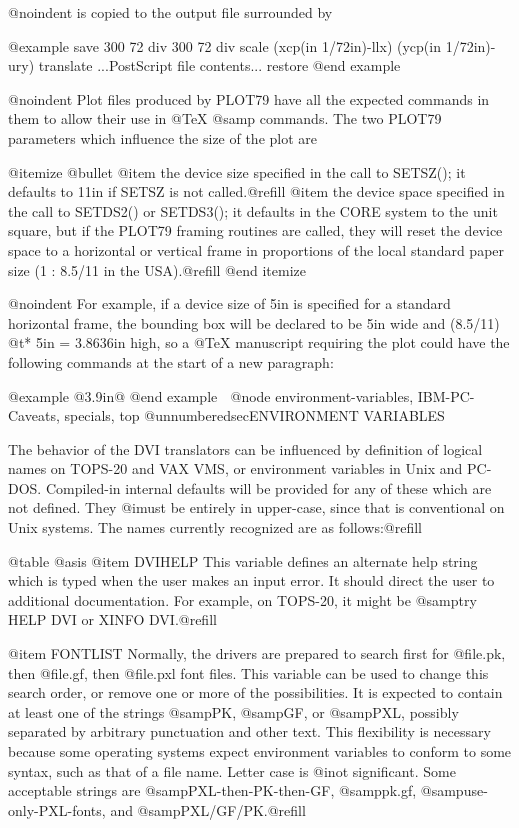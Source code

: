 {@noindent
is copied to the output file surrounded by

@example
save
300 72 div 300 72 div scale %
(xcp(in 1/72in)-llx) (ycp(in 1/72in)-ury) translate
...PostScript file contents...
restore
@end example

@noindent
Plot files produced by PLOT79 have all the expected commands in
them to allow their use in @TeX{} @samp{} commands.
The two PLOT79 parameters which influence the size of the plot
are

@itemize @bullet
@item
the device size specified in the call to SETSZ(); it defaults
to 11in if SETSZ is not called.@refill
@item
the device space specified in the call to SETDS2() or
SETDS3(); it defaults in the CORE system to the unit square,
but if the PLOT79 framing routines are called, they will
reset the device space to a horizontal or vertical frame in
proportions of the local standard paper size (1 : 8.5/11 in
the USA).@refill
@end itemize

@noindent
For example, if a device size of 5in is specified for a standard
horizontal frame, the bounding box will be declared to be 5in
wide and (8.5/11) @t{*} 5in = 3.8636in high, so a @TeX{} manuscript
requiring the plot could have the following commands at the start
of a new paragraph:

@example
\vspace*@{3.9in@}
@end example

@node environment-variables, IBM-PC-Caveats, specials, top
@unnumberedsec{ENVIRONMENT VARIABLES}

The behavior of the DVI translators can be influenced by
definition of logical names on TOPS-20 and VAX VMS, or
environment variables in Unix and PC-DOS.  Compiled-in internal
defaults will be provided for any of these which are not defined.
They @i{must} be entirely in upper-case, since that is
conventional on Unix systems.  The names currently recognized are
as follows:@refill

@table @asis
@item DVIHELP
This variable defines an alternate help string which is typed
when the user makes an input error.  It should direct the
user to additional documentation.  For example, on TOPS-20,
it might be @samp{try HELP DVI or XINFO DVI}.@refill

@item FONTLIST
Normally, the drivers are prepared to search first for
@file{.pk}, then @file{.gf}, then @file{.pxl} font files.
This variable can be used to change this search order, or
remove one or more of the possibilities.  It is expected to
contain at least one of the strings @samp{PK}, @samp{GF}, or
@samp{PXL}, possibly separated by arbitrary punctuation and
other text.  This flexibility is necessary because some
operating systems expect environment variables to conform to
some syntax, such as that of a file name.  Letter case is
@i{not} significant.  Some acceptable strings are
@samp{PXL-then-PK-then-GF}, @samp{pk.gf},
@samp{use-only-PXL-fonts}, and @samp{PXL/GF/PK}.@refill

}
